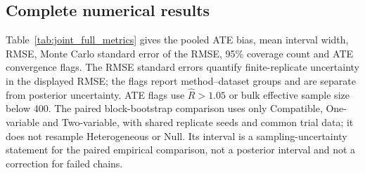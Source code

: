 \subsection{Complete numerical results}

Table~\ref{tab:joint_full_metrics} gives the pooled ATE bias, mean interval width, RMSE, Monte Carlo standard error of the RMSE, 95\% coverage count and ATE convergence flags. The RMSE standard errors quantify finite-replicate uncertainty in the displayed RMSE; the flags report method--dataset groups and are separate from posterior uncertainty. ATE flags use $\widehat R>1.05$ or bulk effective sample size below 400. The paired block-bootstrap comparison uses only Compatible, One-variable and Two-variable, with shared replicate seeds and common trial data; it does not resample Heterogeneous or Null. Its interval is a sampling-uncertainty statement for the paired empirical comparison, not a posterior interval and not a correction for failed chains.

